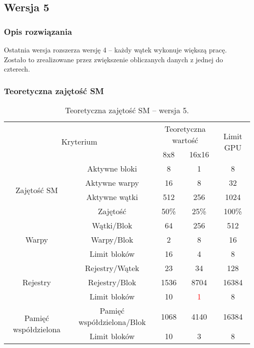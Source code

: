 
\subsection{Wersja 5}

\subsubsection{Opis rozwiązania}

Ostatnia wersja rozszerza wersję 4 -- każdy wątek wykonuje większą pracę. Zostało to zrealizowane przez zwiększenie obliczanych danych z jednej do czterech.



\subsubsection{Teoretyczna zajętość SM}

\begin{center}
\begin{table}[H]
\centering
\begin{tabular}{|c|c|c|c|c|}
\hline
\multicolumn{2}{|c|}{\multirow{2}{*}{Kryterium}} & \multicolumn{2}{c|}{Teoretyczna wartość} & \multirow{2}{*}{Limit GPU} \\ \cline{3-4}
\multicolumn{2}{|c|}{} & 8x8 & 16x16 & \\ \hline
\multirow{4}{*}{Zajętość SM} & Aktywne bloki & 8 & 1 & 8 \\ \cline{2-5}
& Aktywne warpy & 16 & 8 & 32 \\ \cline{2-5}
& Aktywne wątki & 512 & 256 & 1024 \\ \cline{2-5}
& Zajętość & 50\% & 25\% & 100\% \\ \hline
\multirow{3}{*}{Warpy} & Wątki/Blok & 64 & 256 & 512 \\ \cline{2-5}
& Warpy/Blok & 2 & 8 & 16 \\ \cline{2-5}
& Limit bloków & 16 & 4 & 8 \\ \hline
\multirow{3}{*}{Rejestry} & Rejestry/Wątek & 23 & 34 & 128 \\ \cline{2-5}
& Rejestry/Blok & 1536 & 8704 & 16384 \\ \cline{2-5}
& Limit bloków & 10 & \textcolor{red}{1} & 8 \\ \hline
\multirow{2}{*}{Pamięć współdzielona} & Pamięć współdzielona/Blok & 1068 & 4140 & 16384 \\ \cline{2-5}
& Limit bloków & 10 & 3 & 8 \\ \hline
\end{tabular}
\caption{Teoretyczna zajętość SM -- wersja 5.}
\end{table}
\end{center}

